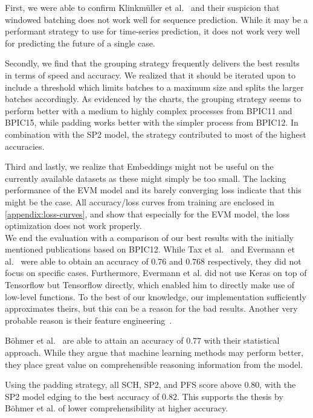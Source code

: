 First, we were able to confirm Klinkmüller et al.~\cite{klinkmuller2018reliablemonitoring} and their suspicion that windowed batching does not work well for sequence prediction. While it may be a performant strategy to use for time-series prediction, it does not work very well for predicting the future of a single case.

Secondly, we find that the grouping strategy frequently delivers the best results in terms of speed and accuracy. We realized that it should be iterated upon to include a threshold which limits batches to a maximum size and splits the larger batches accordingly. As evidenced by the charts, the grouping strategy seems to perform better with a medium to highly complex processes from BPIC11 and BPIC15, while padding works better with the simpler process from BPIC12. In combination with the SP2 model, the strategy contributed to most of the highest accuracies.

Third and lastly, we realize that Embeddings might not be useful on the currently available datasets as these might simply be too small. The lacking performance of the EVM model and its barely converging loss indicate that this might be the case. All accuracy/loss curves from training are enclosed in \autoref{appendix:loss-curves}, and show that especially for the EVM model, the loss optimization does not work properly.\\

We end the evaluation with a comparison of our best results with the initially mentioned publications based on BPIC12. While Tax et al.~\cite{tax2017} and Evermann et al.~\cite{evermann2016} were able to obtain an accuracy of $0.76$ and $0.768$ respectively, they did not focus on specific cases. Furthermore, Evermann et al. did not use Keras on top of Tensorflow but Tensorflow directly, which enabled him to directly make use of low-level functions. To the best of our knowledge, our implementation sufficiently approximates theirs, but this can be a reason for the bad results. Another very probable reason is their feature engineering~\cite{evermann2016}.

Böhmer et al.~\cite{boehmer2018probability} are able to attain an accuracy of $0.77$ with their statistical approach. While they argue that machine learning methods may perform better, they place great value on comprehensible reasoning information from the model.

Using the padding strategy, all SCH, SP2, and PFS score above $0.80$, with the SP2 model edging to the best accuracy of $0.82$. This supports the thesis by Böhmer et al. of lower comprehensibility at higher accuracy.
